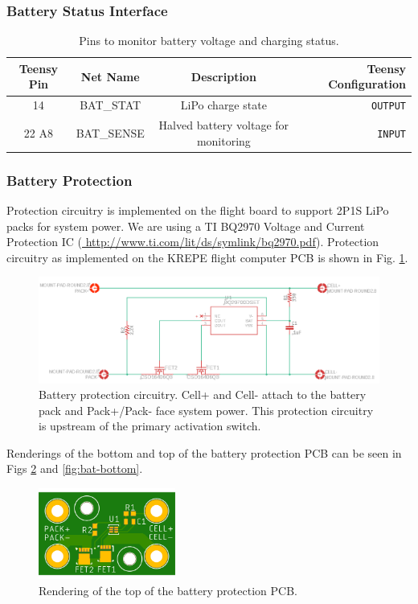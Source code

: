 \documentclass{article}
\begin{document}
\subsubsection{Battery Status Interface}
\begin{table}[H]
    \centering
    \begin{tabular}{c|c|c|r}
    Teensy Pin & Net Name  & Description   & Teensy Configuration \\
    \hline 
    14 & BAT\_STAT & LiPo charge state & \texttt{OUTPUT} \\
    22 A8 & BAT\_SENSE    &  Halved battery voltage for monitoring &   \texttt{INPUT} \\
    \end{tabular}
    \caption{Pins to monitor battery voltage and charging status.}
    \label{tab:pins_battery}
\end{table}

\subsubsection{Battery Protection}
Protection circuitry is implemented on the flight board to support 2P1S LiPo packs for system power. We are using a TI BQ2970 Voltage and Current Protection IC (\url{ http://www.ti.com/lit/ds/symlink/bq2970.pdf}). Protection circuitry as implemented on the KREPE flight computer PCB is shown in Fig. \ref{fig:bat-protec}.

\begin{figure}[H]
    \centering
    \includegraphics[width=\textwidth]{images/battery_protection_schematic.png}
    \caption{Battery protection circuitry. Cell+ and Cell- attach to the battery pack and Pack+/Pack- face system power. This protection circuitry is upstream of the primary activation switch.}
    \label{fig:bat-protec}
\end{figure}

Renderings of the bottom and top of the battery protection PCB can be seen in Figs \ref{fig:bat-top} and \ref{fig:bat-bottom}.


\begin{figure}[H]
    \centering
    \includegraphics[width=0.4\textwidth]{images/BatteryProtection-render-top.png}
    \caption{Rendering of the top of the battery protection PCB.}
    \label{fig:bat-top}
\end{figure}
\end{document}
